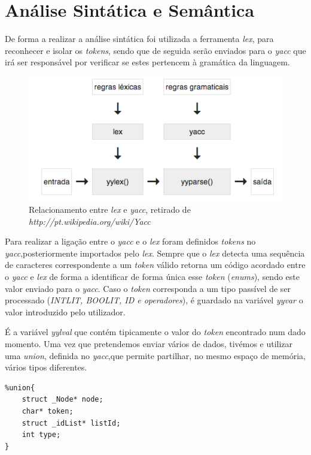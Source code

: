 \documentclass[12pt]{article}
\begin{document}
	
\pagebreak

\section{Análise Sintática e Semântica}
De forma a realizar a análise sintática foi utilizada a ferramenta \emph{lex}, para reconhecer e isolar os \emph{tokens}, sendo que de seguida serão enviados para o \emph{yacc} que irá ser responsável por verificar se estes pertencem à gramática da linguagem.


\begin{figure}[H]
       \centering
       \includegraphics[keepaspectratio=true, scale = 0.82]{lex_yacc.png}
       \caption{Relacionamento entre \emph{lex} e \emph{yacc}, retirado de \emph{http://pt.wikipedia.org/wiki/Yacc}}
       \end{figure}
       
Para realizar a ligação entre o \emph{yacc} e o \emph{lex} foram definidos \emph{tokens} no  \emph{yacc},posteriormente importados pelo \emph{lex}. Sempre que o \emph{lex} detecta uma sequência de caracteres correspondente a um \emph{token} válido retorna um código acordado entre o \emph{yacc} e \emph{lex} de forma a identificar de forma única esse \emph{token} (\emph{enums}), sendo este valor enviado para o \emph{yacc}. 
Caso o \emph{token} corresponda a um tipo passível de ser processado (\emph{INTLIT, BOOLIT, ID e operadores}), é guardado na variável \emph{yyvar} o valor introduzido pelo utilizador.
\par É a variável \emph{yylval} que contém tipicamente o valor do \emph{token} encontrado num dado momento. Uma vez que pretendemos enviar vários de dados, tivémos e utilizar uma \emph{union}, definida no \emph{yacc},que permite partilhar, no mesmo espaço de memória, vários tipos diferentes.
\begin{lstlisting}
%union{
    struct _Node* node;
    char* token;
    struct _idList* listId;
    int type;
}
\end{lstlisting}       
\end{document}
